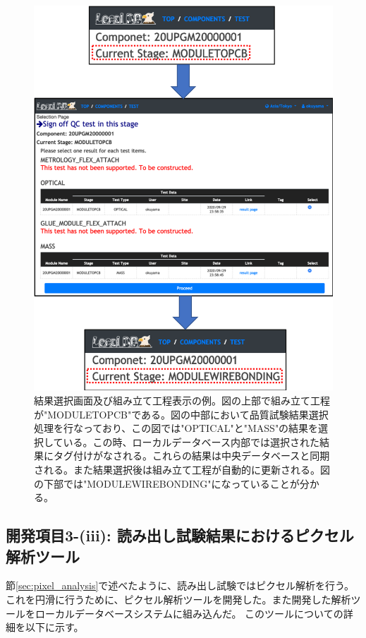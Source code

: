 \begin{figure}[bpt]\centering
\includegraphics[width=14cm]{./webapp_sign_off.png}
\caption[結果選択画面及び組み立て工程表示の例]{結果選択画面及び組み立て工程表示の例。図の上部で組み立て工程が"MODULETOPCB"である。図の中部において品質試験結果選択処理を行なっており、この図では"OPTICAL"と"MASS"の結果を選択している。この時、ローカルデータベース内部では選択された結果にタグ付けがなされる。これらの結果は中央データベースと同期される。また結果選択後は組み立て工程が自動的に更新される。図の下部では"MODULEWIREBONDING"になっていることが分かる。}
\label{webapp_sign_off}
\end{figure}

\clearpage

\newpage
\subsection{開発項目3-(iii): 読み出し試験結果におけるピクセル解析ツール}\label{sec:analysis_tool}
節\ref{sec:pixel_analysis}で述べたように、読み出し試験ではピクセル解析を行う。
これを円滑に行うために、ピクセル解析ツールを開発した。また開発した解析ツールをローカルデータベースシステムに組み込んだ。
このツールについての詳細を以下に示す。

